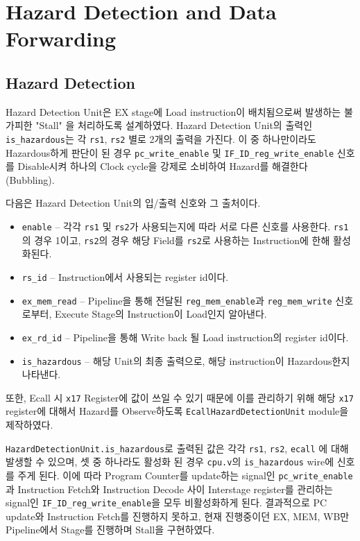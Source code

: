 \documentclass{scrartcl}
\begin{document}
\section{Hazard Detection and Data Forwarding} \label{hzdfwd}

\subsection{Hazard Detection}
Hazard Detection Unit은 EX stage에 Load instruction이 배치됨으로써 발생하는 불가피한 "Stall" 을 처리하도록 설계하였다.
Hazard Detection Unit의 출력인 \texttt{is\_hazardous}는 각 \texttt{rs1}, \texttt{rs2} 별로 2개의 출력을 가진다.
이 중 하나만이라도 Hazardous하게 판단이 된 경우 \texttt{pc\_write\_enable} 및 \texttt{IF\_ID\_reg\_write\_enable} 신호를 Disable시켜 하나의 Clock cycle을 강제로 소비하여 Hazard를 해결한다 (Bubbling).

다음은 Hazard Detection Unit의 입/출력 신호와 그 출처이다.
\begin{itemize}
  \item \texttt{enable} -- 각각 \texttt{rs1} 및 \texttt{rs2}가 사용되는지에 따라 서로 다른 신호를 사용한다. \texttt{rs1}의 경우 1이고, \texttt{rs2}의 경우 해당 Field를 \texttt{rs2}로 사용하는 Instruction에 한해 활성화된다.
  \item \texttt{rs\_id} -- Instruction에서 사용되는 register id이다.
  \item \texttt{ex\_mem\_read} -- Pipeline을 통해 전달된 \texttt{reg\_mem\_enable}과 \texttt{reg\_mem\_write} 신호로부터, Execute Stage의 Instruction이 Load인지 알아낸다.
  \item \texttt{ex\_rd\_id} -- Pipeline을 통해 Write back 될 Load instruction의 register id이다.
  \item \texttt{is\_hazardous} -- 해당 Unit의 최종 출력으로, 해당 instruction이 Hazardous한지 나타낸다.
\end{itemize}

또한, Ecall 시 \texttt{x17} Register에 값이 쓰일 수 있기 때문에 이를 관리하기 위해 해당 \texttt{x17} register에 대해서 Hazard를 Observe하도록 \texttt{EcallHazardDetectionUnit} module을 제작하였다.

\texttt{HazardDetectionUnit.is\_hazardous}로 출력된 값은 각각 \texttt{rs1}, \texttt{rs2}, \texttt{ecall} 에 대해 발생할 수 있으며, 셋 중 하나라도 활성화 된 경우 \texttt{cpu.v}의 \texttt{is\_hazardous} wire에 신호를 주게 된다.
이에 따라 Program Counter를 update하는 signal인 \texttt{pc\_write\_enable}과 Instruction Fetch와 Instruction Decode 사이 Interstage register를 관리하는 signal인 \texttt{IF\_ID\_reg\_write\_enable}을 모두 비활성화하게 된다.
결과적으로 PC update와 Instruction Fetch를 진행하지 못하고, 현재 진행중이던 EX, MEM, WB만 Pipeline에서 Stage를 진행하며 Stall을 구현하였다.
\end{document}
